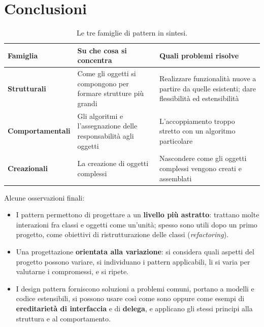 
\section{Conclusioni}

\begin{table}[H]
\centering
\renewcommand{\arraystretch}{1.35}
\begin{tabularx}{\textwidth}{>{\bfseries}P{3.2cm} L L}
\toprule
Famiglia & Su che cosa si concentra & Quali problemi risolve \\
\midrule
Strutturali & Come gli oggetti si compongono per formare strutture più grandi & Realizzare funzionalità nuove a partire
  da quelle esistenti; dare flessibilità ed estensibilità \\
Comportamentali & Gli algoritmi e l'assegnazione delle responsabilità agli oggetti & L'accoppiamento troppo stretto con un
  algoritmo particolare \\
Creazionali & La creazione di oggetti complessi & Nascondere come gli oggetti complessi vengono creati e assemblati \\
\bottomrule
\end{tabularx}
\caption{Le tre famiglie di pattern in sintesi.}
\end{table}

Alcune osservazioni finali:
\begin{itemize}
  \item I pattern permettono di progettare a un \textbf{livello più astratto}: trattano molte interazioni fra classi e oggetti
        come un'unità; spesso sono utili dopo un primo progetto, come obiettivi di ristrutturazione delle classi
        (\textit{refactoring}).
  \item Una progettazione \textbf{orientata alla variazione}: si considera quali aspetti del progetto possono variare, si
        individuano i pattern applicabili, li si varia per valutarne i compromessi, e si ripete.
  \item I design pattern forniscono soluzioni a problemi comuni, portano a modelli e codice estensibili, si possono usare così
        come sono oppure come esempi di \textbf{ereditarietà di interfaccia} e di \textbf{delega}, e applicano gli stessi
        principi alla struttura e al comportamento.
\end{itemize}

